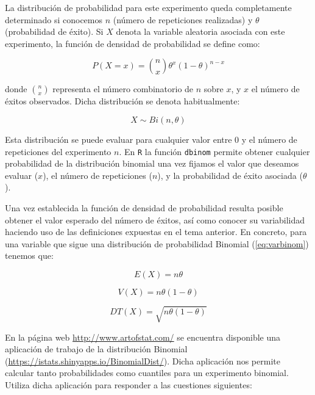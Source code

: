 \documentclass[
]{book}
\begin{document}
La distribución de probabilidad para este experimento queda completamente determinado si conocemos \(n\) (número de repeticiones realizadas) y \(\theta\) (probabilidad de éxito). Si \(X\) denota la variable aleatoria asociada con este experimento, la función de densidad de probabilidad se define como:

\begin{equation} 
  P(X = x) = {n \choose x} \theta^x (1-\theta)^{n-x}
  \label{eq:probbinom}
\end{equation}

donde \({n \choose x}\) representa el número combinatorio de \(n\) sobre \(x\), y \(x\) el número de éxitos observados. Dicha distribución se denota habitualmente:

\begin{equation} 
  X \sim Bi(n, \theta)
  \label{eq:varbinom}
\end{equation}

Esta distribución se puede evaluar para cualquier valor entre 0 y el número de repeticiones del experimento \(n\). En \texttt{R} la función \texttt{dbinom} permite obtener cualquier probabilidad de la distribución binomial una vez fijamos el valor que deseamos evaluar (\(x\)), el número de repeticiones (\(n\)), y la probabilidad de éxito asociada (\(\theta\)).

Una vez establecida la función de densidad de probabilidad resulta posible obtener el valor esperado del número de éxitos, así como conocer su variabilidad haciendo uso de las definiciones expuestas en el tema anterior. En concreto, para una variable que sigue una distribución de probabilidad Binomial (\eqref{eq:varbinom}) tenemos que:

\begin{equation} 
  E(X) = n \theta
  \label{eq:espbinom}
\end{equation}

\begin{equation} 
  V(X) = n \theta (1-\theta)
  \label{eq:varbinom}
\end{equation}

\begin{equation} 
  DT(X) = \sqrt{n \theta (1-\theta)}
  \label{eq:sdbinom}
\end{equation}

En la página web \url{http://www.artofstat.com/} se encuentra disponible una aplicación de trabajo de la distribución Binomial (\url{https://istats.shinyapps.io/BinomialDist/}). Dicha aplicación nos permite calcular tanto probabilidades como cuantiles para un experimento binomial. Utiliza dicha aplicación para responder a las cuestiones siguientes:
\end{document}
